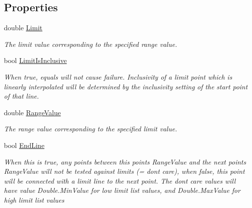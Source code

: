 \subsection*{Properties}
\begin{DoxyCompactItemize}
\item 
double \mbox{\hyperlink{class_c_s_i_1_1_library_1_1_array_utilities_1_1_array_limit_checks_1_1_limit_point_a10dca35d12bbec7356f7861eb952c46b}{Limit}}
\begin{DoxyCompactList}\small\item\em The limit value corresponding to the specified range value. \end{DoxyCompactList}\item 
bool \mbox{\hyperlink{class_c_s_i_1_1_library_1_1_array_utilities_1_1_array_limit_checks_1_1_limit_point_aeda976e335b30a4488970cb159f55d8d}{Limit\+Is\+Inclusive}}
\begin{DoxyCompactList}\small\item\em When true, equals will not cause failure. Inclusivity of a limit point which is linearly interpolated will be determined by the inclusivity setting of the start point of that line. \end{DoxyCompactList}\item 
double \mbox{\hyperlink{class_c_s_i_1_1_library_1_1_array_utilities_1_1_array_limit_checks_1_1_limit_point_a5a8d729144fd21c67fed5f1f842588c0}{Range\+Value}}
\begin{DoxyCompactList}\small\item\em The range value corresponding to the specified limit value. \end{DoxyCompactList}\item 
bool \mbox{\hyperlink{class_c_s_i_1_1_library_1_1_array_utilities_1_1_array_limit_checks_1_1_limit_point_a54f1aa045febf7425660b0e4ad79d2d0}{End\+Line}}
\begin{DoxyCompactList}\small\item\em When this is true, any points between this point\textquotesingle{}s Range\+Value and the next point\textquotesingle{}s Range\+Value will not be tested against limits (= don\textquotesingle{}t care), when false, this point will be connected with a limit line to the next point. The don\textquotesingle{}t care values will have value Double.\+Min\+Value for low limit list values, and Double.\+Max\+Value for high limit list values \end{DoxyCompactList}\end{DoxyCompactItemize}


